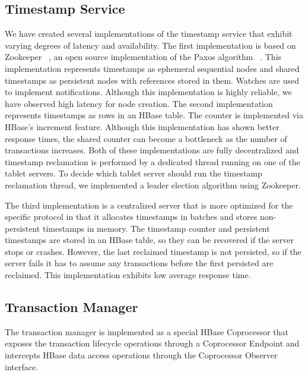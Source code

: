 \documentclass[10pt,final,journal]{IEEEtran}
\begin{document}
\subsection{Timestamp Service}
We have created several implementations of the timestamp service that exhibit varying degrees of latency and availability. The first implementation is based on Zookeeper ~\cite{Hunt:2010:ZWC:1855840.1855851}, an open source implementation of the Paxos algorithm ~\cite{Lamport:1998:PP:279227.279229, Lamport:2001:PMS}. This implementation represents timestamps as ephemeral sequential nodes and shared timestamps as persistent nodes with references stored in them. Watches are used to implement notifications. Although this implementation is highly reliable, we have observed high latency for node creation. The second implementation represents timestamps as rows in an HBase table. The counter is implemented via HBase's increment feature. Although this implementation has shown better response times, the shared counter can become a bottleneck as the number of transactions increases. Both of these implementations are fully decentralized and timestamp reclamation is performed by a dedicated thread running on one of the tablet servers. To decide which tablet server should run the timestamp reclamation thread, we implemented a leader election algorithm using Zookeeper.

The third implementation is a centralized server that is more optimized for the specific protocol in that it allocates timestamps in batches and stores non-persistent timestamps in memory. The timestamp counter and persistent timestamps are stored in an HBase table, so they can be recovered if the server stops or crashes. However, the last reclaimed timestamp is not persisted, so if the server fails it has to assume any transactions before the first persisted are reclaimed. This implementation exhibits low average response time.

\subsection{Transaction Manager}
The transaction manager is implemented as a special HBase Coprocessor that exposes the transaction lifecycle operations through a Coprocessor Endpoint and intercepts HBase data access operations through the Coprocessor Observer interface.
\end{document}

